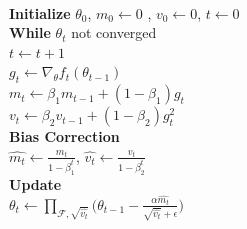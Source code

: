 \documentclass{article}
\begin{document}
\begin{minipage}{0.48\textwidth}
\begin{algorithm}[H]
\label{algo:adam}
 \\
\textbf{Initialize} $\theta_0$, $m_0 \leftarrow 0$ , $v_0 \leftarrow 0$, $t \leftarrow 0$ \\
\textbf{While} $\theta_t$ not converged \\
\hspace{8mm} $t \leftarrow t + 1 $ \\
\hspace{8mm} $g_t \leftarrow \nabla_{\theta}f_t(\theta_{t-1})$ \\
\hspace{8mm} $m_t \leftarrow \beta_1 m_{t-1} + (1 - \beta_1) g_t$ \\
\hspace{8mm} $v_t \leftarrow \beta_2 v_{t-1} + (1 - \beta_2) g_t^2$ \\
\hspace{8mm} \textbf{Bias Correction} \\
\hspace{16mm} $\widehat{m_t} \leftarrow \frac{m_t}{1-\beta_1^t}$, $\widehat{v_t} \leftarrow \frac{v_t}{1-\beta_2^t}$ \\
\hspace{8mm} \textbf{Update} \\
\hspace{16mm} $\theta_t \leftarrow \prod_{\mathcal{F},\sqrt{\widehat{v_t}}} \Big( \theta_{t-1} - \frac{\alpha \widehat{ m_t}} { \sqrt{ \widehat{ v_t}} +\epsilon } \Big)$
\caption{Adam Optimizer}
\end{algorithm}
\end{minipage}
\hfill
\end{document}
